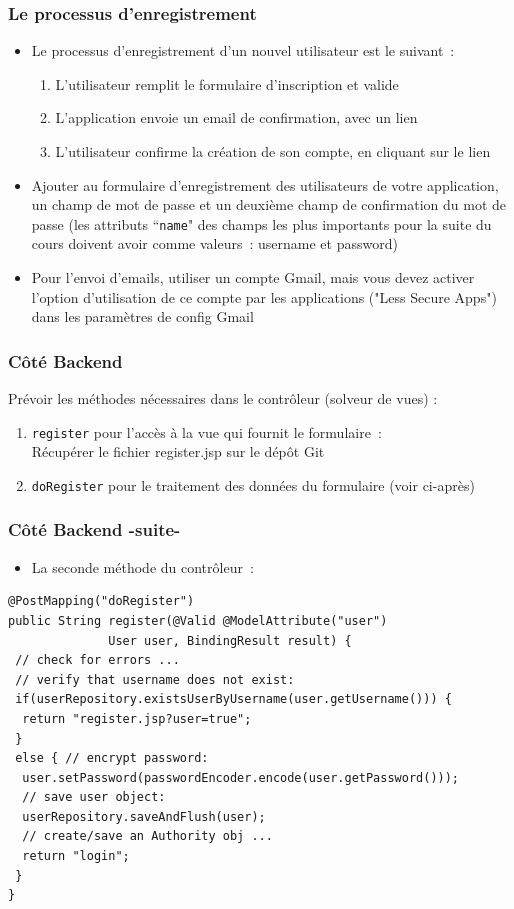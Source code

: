 \documentclass{beamer}
\begin{document}
\begin{frame}
	\frametitle{Le processus d'enregistrement}
	\begin{itemize}
		\item Le processus d'enregistrement d'un nouvel utilisateur est le suivant~:
		\begin{enumerate}
			\item L'utilisateur remplit le formulaire d'inscription et valide
			\item L'application envoie un email de confirmation, avec un lien
			\item L'utilisateur confirme la création de son compte, en cliquant sur le lien
		\end{enumerate}		
		\item Ajouter au formulaire d'enregistrement des utilisateurs de votre application, un champ de mot de passe et un deuxième champ de confirmation du mot de passe (les attributs ``\texttt{name}" des champs les plus importants pour la suite du cours doivent avoir comme valeurs~: username et password)
		\item Pour l'envoi d'emails, utiliser un compte Gmail, mais vous devez activer l'option d'utilisation de ce compte par les applications ("Less Secure Apps") dans les paramètres de config Gmail
	\end{itemize}
\end{frame}

\begin{frame}[fragile]
	\frametitle{Côté Backend}
	Prévoir les méthodes nécessaires dans le contrôleur (solveur de vues) : 
	\begin{enumerate}
		\item \texttt{register} pour l'accès à la vue qui fournit le formulaire~: \\
		Récupérer le fichier register.jsp sur le dépôt Git
		\item \texttt{doRegister} pour le traitement des données du formulaire (voir ci-après)
	\end{enumerate}		

\end{frame}

\begin{frame}[fragile]
\frametitle{Côté Backend -suite-}
\begin{itemize}	
		\item La seconde méthode du contrôleur~:
\end{itemize}		
\begin{lstlisting}
@PostMapping("doRegister")
public String register(@Valid @ModelAttribute("user")
			  User user, BindingResult result) {
 // check for errors ...
 // verify that username does not exist:
 if(userRepository.existsUserByUsername(user.getUsername())) {
  return "register.jsp?user=true";
 }
 else {	// encrypt password:
  user.setPassword(passwordEncoder.encode(user.getPassword()));
  // save user object:
  userRepository.saveAndFlush(user);
  // create/save an Authority obj ...  
  return "login";
 }
}
\end{lstlisting}		
	
\end{frame}
\end{document}
